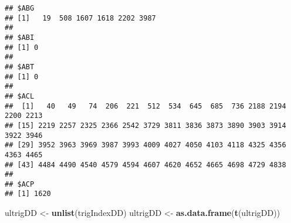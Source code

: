 \documentclass[]{article}
\newenvironment{Shaded}{\begin{snugshade}}{\end{snugshade}}
\newcommand{\KeywordTok}[1]{\textcolor[rgb]{0.13,0.29,0.53}{\textbf{#1}}}
\newcommand{\StringTok}[1]{\textcolor[rgb]{0.31,0.60,0.02}{#1}}
\newcommand{\NormalTok}[1]{#1}
\begin{document}
\begin{verbatim}
## $ABG
## [1]   19  508 1607 1618 2202 3987
## 
## $ABI
## [1] 0
## 
## $ABT
## [1] 0
## 
## $ACL
##  [1]   40   49   74  206  221  512  534  645  685  736 2188 2194 2200 2213
## [15] 2219 2257 2325 2366 2542 3729 3811 3836 3873 3890 3903 3914 3922 3946
## [29] 3952 3963 3969 3987 3993 4009 4027 4050 4103 4118 4325 4356 4363 4465
## [43] 4484 4490 4540 4579 4594 4607 4620 4652 4665 4698 4729 4838
## 
## $ACP
## [1] 1620
\end{verbatim}

\begin{Shaded}
\begin{Highlighting}[]
\NormalTok{ultrigDD <-}\StringTok{ }\KeywordTok{unlist}\NormalTok{(trigIndexDD)}
\NormalTok{ultrigDD <-}\StringTok{ }\KeywordTok{as.data.frame}\NormalTok{(}\KeywordTok{t}\NormalTok{(ultrigDD))}
\end{Highlighting}
\end{Shaded}
\end{document}
